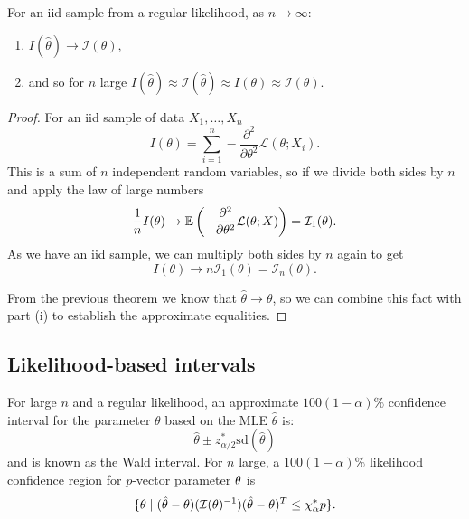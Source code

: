 \documentclass[10pt, a4paper]{article}
\begin{document}
\begin{proposition}
    For an iid sample from a regular likelihood,
    as $n \to \infty$:
    \begin{enumerate}[label = (\roman*)]
        \item $I(\hat{\theta}) \to \mathcal{I}(\theta)$,

        \item and so for $n$ large $I(\hat{\theta}) \approx \mathcal{I}(\hat{\theta}) \approx I(\theta) \approx \mathcal{I}(\theta)$.
    \end{enumerate}

    \begin{proof}
        For an iid sample of data $X_1, \dotsc, X_n$
        \[
        I(\theta) = \sum_{i = 1}^{n}-\frac{\partial ^ 2}{\partial\theta ^ 2}\mathcal{L}(\theta; X_i).
        \]
        This is a sum of $n$ independent random variables,
        so if we divide both sides by $n$ and apply the law of large numbers
        \[
        \frac{1}{n}I(\theta) \to \mathbb{E}\left(-\frac{\partial ^ 2}{\partial\theta ^ 2}\mathcal{L}(\theta; X)\right) = \mathcal{I}_1(\theta).
        \]
        As we have an iid sample,
        we can multiply both sides by $n$ again to get
        \[
        I(\theta) \to n\mathcal{I}_1(\theta) = \mathcal{I}_n(\theta).
        \]

        From the previous theorem we know that $\hat{\theta} \to \theta$,
        so we can combine this fact with part
        (i)
        to establish the approximate equalities.
    \end{proof}
\end{proposition}

\subsection{Likelihood-based intervals}

\begin{corollary}
    For large $n$ and a regular likelihood,
    an approximate $100(1 - \alpha)\%$ confidence interval for the parameter $\theta$ based on the MLE $\hat{\theta}$ is:
    \[
    \hat{\theta} \pm z_{\alpha / 2}^{*}\mathrm{sd}(\hat{\theta})
    \]
    and is known as the Wald interval.
    For $n$ large,
    a $100(1 - \alpha)\%$ likelihood confidence region for $p$-vector parameter $\mathbf{\theta}$ is
    \[
    \{\mathbf{\theta} \mid (\hat{\mathbf{\theta}} - \mathbf{\theta})(\mathcal{I}(\mathbf{\theta}) ^ {-1})(\hat{\mathbf{\theta}} - \mathbf{\theta}) ^ T \leq \chi_{\alpha}^{*}p\}.
    \]
\end{corollary}
\end{document}
